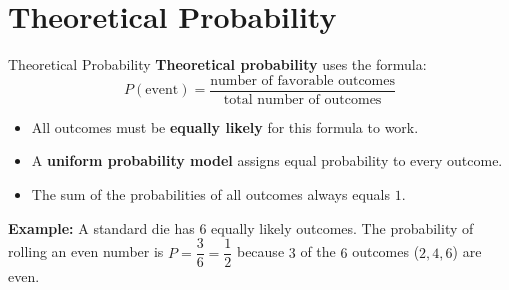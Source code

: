 \section{Theoretical Probability}

\begin{quickReview}{Theoretical Probability}
\textbf{Theoretical probability} uses the formula:
$$P(\text{event}) = \frac{\text{number of favorable outcomes}}{\text{total number of outcomes}}$$

\begin{itemize}[leftmargin=*]
    \item All outcomes must be \textbf{equally likely} for this formula to work.
    \item A \textbf{uniform probability model} assigns equal probability to every outcome.
    \item The sum of the probabilities of all outcomes always equals $1$.
\end{itemize}

\medskip
\textbf{Example:} A standard die has $6$ equally likely outcomes. The probability of rolling an even number is $P = \dfrac{3}{6} = \dfrac{1}{2}$ because $3$ of the $6$ outcomes ($2, 4, 6$) are even.
\end{quickReview}

